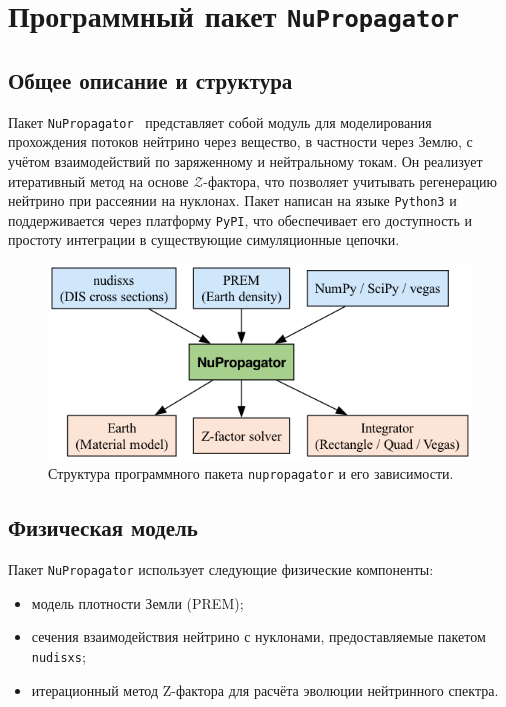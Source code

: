\section{Программный пакет \texttt{NuPropagator}}

\subsection{Общее описание и структура}

Пакет \texttt{NuPropagator}~\cite{nupropagator2022} представляет собой модуль для моделирования прохождения потоков нейтрино через вещество, в частности через Землю, с учётом взаимодействий по заряженному и нейтральному токам. Он реализует итеративный метод на основе $\mathcal{Z}$-фактора, что позволяет учитывать регенерацию нейтрино при рассеянии на нуклонах. Пакет написан на языке \texttt{Python3} и поддерживается через платформу \texttt{PyPI}, что обеспечивает его доступность и простоту интеграции в существующие симуляционные цепочки.

\begin{figure}[!h]
\centering
\includegraphics[width=\linewidth]{images/nupropagator_diagram.png}
\caption{Структура программного пакета \texttt{nupropagator} и его зависимости.}
\label{fig:nupropagator1}
\end{figure}

\subsection{Физическая модель}

Пакет \texttt{NuPropagator} использует следующие физические компоненты:
\begin{itemize}
  \item модель плотности Земли (PREM);
  \item сечения взаимодействия нейтрино с нуклонами, предоставляемые пакетом \texttt{nudisxs};
  \item итерационный метод Z-фактора для расчёта эволюции нейтринного спектра.
\end{itemize}

